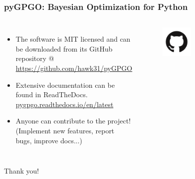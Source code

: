 \documentclass[10pt]{beamer}
\begin{document}
\begin{frame}
\frametitle{pyGPGO: Bayesian Optimization for Python}
\begin{columns}
\centering
\begin{itemize}
\item The software is MIT licensed and can be downloaded from its GitHub repository @ \textcolor{blue}{\url{https://github.com/hawk31/pyGPGO}}
\item Extensive documentation can be found in ReadTheDocs. \textcolor{blue}{\url{pygpgo.readthedocs.io/en/latest}}
\item Anyone can contribute to the project! (Implement new features, report bugs, improve docs...) 
\end{itemize}
\begin{figure}
\includegraphics[width=0.4\textwidth]{figures/github}
\end{figure}
\end{columns}
\end{frame}

\begin{frame}[plain,c]
\begin{center}
\Huge Thank you!
\end{center}
\end{frame}
			
			
\end{document}
